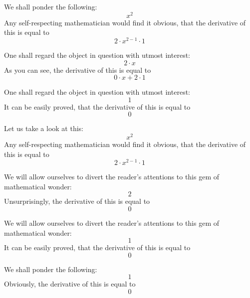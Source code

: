 \documentclass{article}
\begin{document}
We shall ponder the following:
\begin{equation}
x ^{2 } 
\end{equation}
Any self-respecting mathematician would find it obvious, that the derivative of this is equal to
\begin{equation}
2 \cdot x ^{2 - 1 } \cdot 1 
\end{equation}

One shall regard the object in question with utmost interest:
\begin{equation}
2 \cdot x 
\end{equation}
As you can see, the derivative of this is equal to
\begin{equation}
0 \cdot x + 2 \cdot 1 
\end{equation}

One shall regard the object in question with utmost interest:
\begin{equation}
1 
\end{equation}
It can be easily proved, that the derivative of this is equal to
\begin{equation}
0 
\end{equation}

Let us take a look at this:
\begin{equation}
x ^{2 } 
\end{equation}
Any self-respecting mathematician would find it obvious, that the derivative of this is equal to
\begin{equation}
2 \cdot x ^{2 - 1 } \cdot 1 
\end{equation}

We will allow ourselves to divert the reader's attentions to this gem of mathematical wonder:
\begin{equation}
2 
\end{equation}
Unsurprisingly, the derivative of this is equal to
\begin{equation}
0 
\end{equation}

We will allow ourselves to divert the reader's attentions to this gem of mathematical wonder:
\begin{equation}
1 
\end{equation}
It can be easily proved, that the derivative of this is equal to
\begin{equation}
0 
\end{equation}

We shall ponder the following:
\begin{equation}
1 
\end{equation}
Obviously, the derivative of this is equal to
\begin{equation}
0 
\end{equation}
\end{document}
